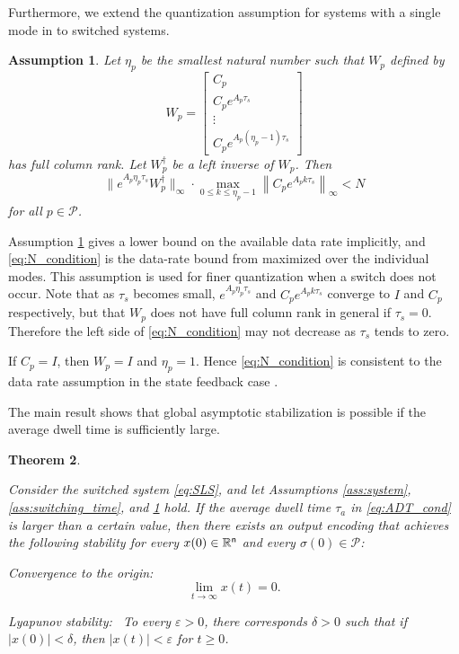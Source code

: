 \documentclass[letterpaper, 11pt, onecolumn]{ieeeconf}  \IEEEoverridecommandlockouts
\newtheorem{theorem}{Theorem}[section]
\newtheorem{assumption}[theorem]{Assumption}
\begin{document}
Furthermore, we extend the quantization assumption for 
systems with a single mode in \cite{Liberzon2003} to
switched systems.
\begin{assumption}
\label{ass:quantization}
{\em
Let $\eta_p$ be the smallest natural number such that
$W_p$ defined by
\begin{equation}
\label{eq:WpDef}
W_p = 
\begin{bmatrix}
C_p \\ C_p e^{A_p\tau_s} \\ \vdots \\
C_p e^{A_p(\eta_p - 1)\tau_s}
\end{bmatrix}
\end{equation}
has full column rank.
Let $W_p^{\dagger}$ be a left inverse of $W_p$.
Then 
\begin{equation}
\label{eq:N_condition}
\|e^{A_p \eta_p \tau_s}W_p^{\dagger}\|_{\infty}
\cdot \max_{0\leq k \leq \eta_p-1}\left\|C_pe^{A_p k \tau_s}\right\|_{\infty} < N
\end{equation}
for all $p \in \mathcal{P}$.
}
\end{assumption}

Assumption \ref{ass:quantization} gives a lower bound on the available data rate
implicitly, and
\eqref{eq:N_condition} is the data-rate bound from \cite{Liberzon2003} 
maximized over the individual modes.
This assumption is used for finer quantization when a switch does not occur.
Note that as $\tau_s$ becomes small,
$e^{A_p \eta_p \tau_s}$ and $C_pe^{A_p k \tau_s}$
converge to $I$ and $C_p$ respectively, but that $W_p$ does not have full column 
rank in general
if $\tau_s = 0$.
Therefore
the left side of \eqref{eq:N_condition} may not decrease 
as $\tau_s$ tends to zero.

If $C_p = I$, then $W_p = I$ and $\eta_p = 1$.
Hence \eqref{eq:N_condition} is consistent to
the data rate assumption in the state feedback case \cite{Liberzon2014}.


The main result shows that
global asymptotic stabilization is possible if
the average dwell time is sufficiently large.
\begin{theorem}
\label{thm:stability_theorem2}
{\em
Consider the switched system \eqref{eq:SLS}, and let 
Assumptions \ref{ass:system}, \ref{ass:switching_time}, and 
\ref{ass:quantization} hold.
If the average dwell time $\tau_a$ in \eqref{eq:ADT_cond} 
is larger than a certain value, then
there exists an output encoding that achieves the following stability
for every $x(0) \in \mathbb{R}^{\sf n}$ and every $\sigma(0) \in \mathcal{P}$:

\noindent
{\sl Convergence to the origin:~}
\begin{equation}
\label{eq:convergence_x}
\lim_{t \to \infty}x(t) = 0.
\end{equation}

\noindent
{\sl Lyapunov stability:~}
To every $\varepsilon > 0$, there corresponds $\delta > 0$ such that
if $|x(0)| < \delta$, then $|x(t)| < \varepsilon$
for $t \geq 0$.
}
\end{theorem}
\end{document}
